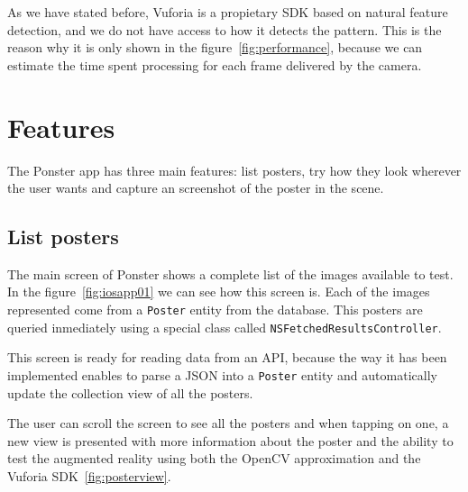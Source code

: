 As we have stated before, Vuforia is a propietary SDK based on natural feature
detection, and we do not have access to how it detects the pattern. This is the
reason why it is only shown in the figure~\ref{fig:performance}, because we can
estimate the time spent processing for each frame delivered by the camera.

\section{Features}
The Ponster app has three main features: list posters, try how they look wherever
the user wants and capture an screenshot of the poster in the scene. 

\subsection*{List posters}
The main screen of Ponster shows a complete list of the images available to
test. In the figure~\ref{fig:iosapp01} we can see how this screen is. Each of
the images represented come from a \texttt{Poster} entity from the
database. This posters are queried inmediately using a special class called
\texttt{NS\-Fetched\-Results\-Controller}. 

This screen is ready for reading data from an API, because the way it has been
implemented enables to parse a JSON into a \texttt{Poster} entity and
automatically update the collection view of all the posters. 

The user can scroll the screen to see all the posters and when tapping on one,
a new view is presented with more information about the poster and the ability
to test the augmented reality using both the OpenCV approximation and the
Vuforia SDK~\ref{fig:posterview}.

